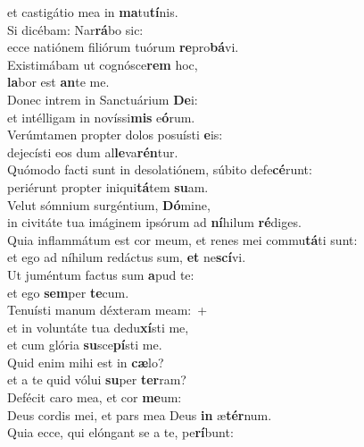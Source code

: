 \evenverse et castigátio mea in \textbf{ma}tu\textbf{tí}nis.\\
\oddverse Si dicébam: Nar\textbf{rá}bo sic:~\*\\
\oddverse ecce natiónem filiórum tuórum \textbf{re}pro\textbf{bá}vi.\\
\evenverse Existimábam ut cognósce\textbf{rem} hoc,~\*\\
\evenverse \textbf{la}bor est \textbf{an}te me.\\
\oddverse Donec intrem in Sanctuárium \textbf{De}i:~\*\\
\oddverse et intélligam in novíssi\textbf{mis} e\textbf{ó}rum.\\
\evenverse Verúmtamen propter dolos posuísti \textbf{e}is:~\*\\
\evenverse dejecísti eos dum al\textbf{le}va\textbf{rén}tur.\\
\oddverse Quómodo facti sunt in desolatiónem, súbito defe\textbf{cé}runt:~\*\\
\oddverse periérunt propter iniqui\textbf{tá}tem \textbf{su}am.\\
\evenverse Velut sómnium surgéntium, \textbf{Dó}mine,~\*\\
\evenverse in civitáte tua imáginem ipsórum ad \textbf{ní}hilum \textbf{ré}diges.\\
\oddverse Quia inflammátum est cor meum, et renes mei commu\textbf{tá}ti sunt:~\*\\
\oddverse et ego ad níhilum redáctus sum, \textbf{et} ne\textbf{scí}vi.\\
\evenverse Ut juméntum factus sum \textbf{a}pud te:~\*\\
\evenverse et ego \textbf{sem}per \textbf{te}cum.\\
\oddverse Tenuísti manum déxteram meam:~+\\
\oddverse  et in voluntáte tua dedu\textbf{xí}sti me,~\*\\
\oddverse et cum glória \textbf{su}sce\textbf{pí}sti me.\\
\evenverse Quid enim mihi est in \textbf{cæ}lo?~\*\\
\evenverse et a te quid vólui \textbf{su}per \textbf{ter}ram?\\
\oddverse Defécit caro mea, et cor \textbf{me}um:~\*\\
\oddverse Deus cordis mei, et pars mea Deus \textbf{in} æ\textbf{tér}num.\\
\evenverse Quia ecce, qui elóngant se a te, pe\textbf{rí}bunt:~\*\\

